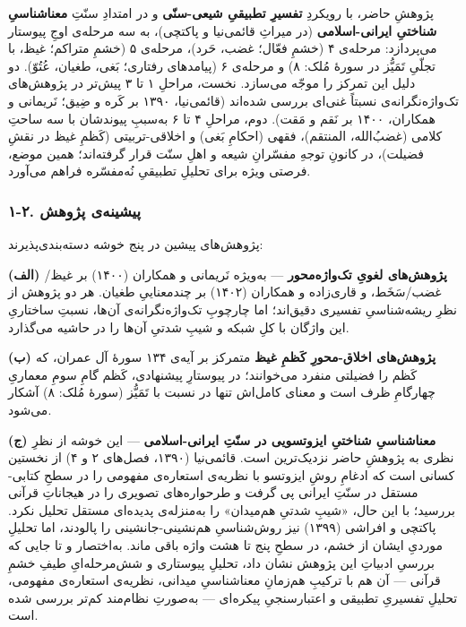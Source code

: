 \documentclass[12pt,a4paper]{article}
\begin{document}
\begin{RTL}
\begin{otherlanguage}{persian}
پژوهشِ حاضر، با رویکردِ \textbf{تفسیرِ تطبیقیِ شیعی-سنّی} و در امتدادِ سنّتِ
\textbf{معناشناسیِ شناختیِ ایرانی-اسلامی} (در میراثِ قائمی‌نیا و پاکتچی)، به
سه مرحله‌ی اوجِ پیوستار می‌پردازد: مرحله‌ی ۴ (خشمِ فعّال؛ غضب، حَرد)، مرحله‌ی ۵
(خشمِ متراکم؛ غیظ، با تجلّیِ تَمَیُّز در سورۀ مُلک: ۸) و مرحله‌ی ۶ (پیامدهای
رفتاری؛ بَغی، طغیان، عُتُوّ). دو دلیل این تمرکز را موجّه می‌سازد. نخست، مراحلِ
۱ تا ۳ پیش‌تر در پژوهش‌های تک‌واژه‌نگرانه‌ی نسبتاً غنی‌ای بررسی شده‌اند
(قائمی‌نیا، ۱۳۹۰ بر کَره و ضِیق؛ نَریمانی و همکاران، ۱۴۰۰ بر نَقم و مَقت).
دوم، مراحلِ ۴ تا ۶ به‌سببِ پیوندشان با سه ساحتِ کلامی (غضبُ‌الله، المنتقم)،
فقهی (احکامِ بَغی) و اخلاقی-تربیتی (کَظمِ غیظ در نقشِ فضیلت)، در کانونِ توجهِ
مفسّرانِ شیعه و اهلِ سنّت قرار گرفته‌اند؛ همین موضع، فرصتی ویژه برای تحلیلِ
تطبیقیِ نُه‌مفسّره فراهم می‌آورد.

\subsubsection{۱-۲. پیشینه‌ی
پژوهش}\label{ux67eux6ccux634ux6ccux646ux647ux6cc-ux67eux698ux648ux647ux634}

پژوهش‌های پیشین در پنج خوشه دسته‌بندی‌پذیرند:

\textbf{(الف) پژوهش‌های لغویِ تک‌واژه‌محور} --- به‌ویژه نَریمانی و همکاران
(۱۴۰۰) بر غیظ/غضب/سَخَط، و قاری‌زاده و همکاران (۱۴۰۲) بر چندمعناییِ طغیان.
هر دو پژوهش از نظرِ ریشه‌شناسیِ تفسیری دقیق‌اند؛ اما چارچوبِ تک‌واژه‌نگرانه‌ی
آن‌ها، نسبتِ ساختاریِ این واژگان با کلِ شبکه و شیبِ شدتیِ آن‌ها را در حاشیه
می‌گذارد.

\textbf{(ب) پژوهش‌های اخلاق-محورِ کَظمِ غیظ} متمرکز بر آیه‌ی ۱۳۴ سورۀ آل
عمران، که کَظم را فضیلتی منفرد می‌خوانند؛ در پیوستارِ پیشنهادی، کَظم گامِ سومِ
معماریِ چهارگامِ ظرف است و معنای کامل‌اش تنها در نسبت با تَمَیُّز (سورۀ مُلک: ۸)
آشکار می‌شود.

\textbf{(ج) معناشناسیِ شناختیِ ایزوتسویی در سنّتِ ایرانی-اسلامی} --- این
خوشه از نظرِ نظری به پژوهشِ حاضر نزدیک‌ترین است. قائمی‌نیا (۱۳۹۰، فصل‌های ۲ و
۴) از نخستین کسانی است که ادغامِ روشِ ایزوتسو با نظریه‌ی استعاره‌ی مفهومی را
در سطحِ کتابی-مستقل در سنّتِ ایرانی پی گرفت و طرحواره‌های تصویری را در
هیجاناتِ قرآنی بررسید؛ با این حال، «شیبِ شدتیِ هم‌میدان» را به‌منزله‌ی پدیده‌ای
مستقل تحلیل نکرد. پاکتچی و افراشی (۱۳۹۹) نیز روش‌شناسیِ هم‌نشینی-جانشینی را
پالودند، اما تحلیلِ موردیِ ایشان از خشم، در سطحِ پنج تا هشت واژه باقی ماند.
به‌اختصار و تا جایی که بررسیِ ادبیاتِ این پژوهش نشان داد، تحلیلِ پیوستاری و
شش‌مرحله‌ایِ طیفِ خشمِ قرآنی --- آن هم با ترکیبِ هم‌زمانِ معناشناسیِ میدانی،
نظریه‌ی استعاره‌ی مفهومی، تحلیلِ تفسیریِ تطبیقی و اعتبارسنجیِ پیکره‌ای ---
به‌صورتِ نظام‌مند کم‌تر بررسی شده است.


\end{otherlanguage}
\end{RTL}
\end{document}
